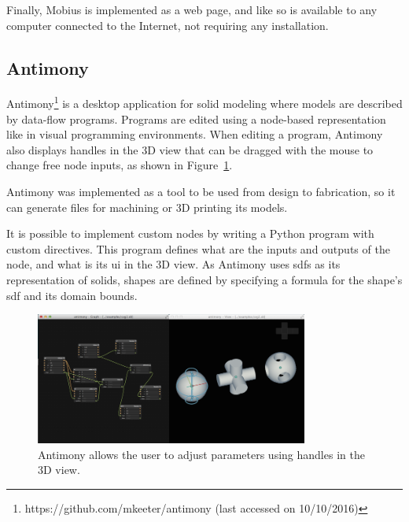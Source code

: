 Finally, Mobius is implemented as a web page, and like so is available to any computer connected to the Internet, not requiring any installation.




\subsection{Antimony}

Antimony\footnote{https://github.com/mkeeter/antimony (last accessed on 10/10/2016)} is a desktop application for solid modeling where models are described by data-flow programs.
Programs are edited using a node-based representation like in visual programming environments.
When editing a program, Antimony also displays handles in the 3D view that can be dragged with the mouse to change free node inputs, as shown in Figure~\ref{fig:antimony:handles}.

Antimony was implemented as a tool to be used from design to fabrication, so it can generate files for machining or 3D printing its models.

It is possible to implement custom nodes by writing a Python program with custom directives.
This program defines what are the inputs and outputs of the node, and what is its \gls{ui} in the 3D view.
As Antimony uses \glspl{sdf} as its representation of solids, shapes are defined by specifying a formula for the shape's \gls{sdf} and its domain bounds.

\begin{figure}
	\centering
	\includegraphics[width=0.8\textwidth]{images/antimony_ui_handles}
	\caption{Antimony allows the user to adjust parameters using handles in the 3D view.}
	\label{fig:antimony:handles}
\end{figure}


